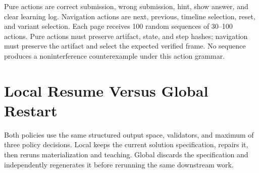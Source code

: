 \documentclass[letterpaper]{article}
\begin{document}
Pure actions are correct submission, wrong submission, hint, show answer, and clear learning log. Navigation actions are next, previous, timeline selection, reset, and variant selection. Each page receives 100 random sequences of 30--100 actions. Pure actions must preserve artifact, state, and step hashes; navigation must preserve the artifact and select the expected verified frame. No sequence produces a noninterference counterexample under this action grammar.

\section{Local Resume Versus Global Restart}

Both policies use the same structured output space, validators, and maximum of three policy decisions. Local keeps the current solution specification, repairs it, then reruns materialization and teaching. Global discards the specification and independently regenerates it before rerunning the same downstream work.
\end{document}
